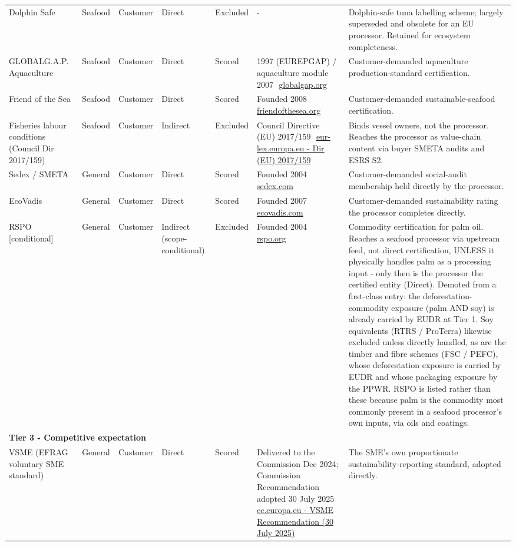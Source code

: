 \begin{landscape}
\begin{longtable}{p{2.9cm}p{1.2cm}p{1.3cm}p{1.2cm}p{1.4cm}p{3.2cm}p{5.9cm}}
Dolphin Safe & Seafood & Customer & Direct & Excluded & - & Dolphin-safe tuna labelling scheme; largely superseded and obsolete for an EU processor. Retained for ecosystem completeness. \\
GLOBALG.A.P. Aquaculture & Seafood & Customer & Direct & Scored & 1997 (EUREPGAP) / aquaculture module 2007~\,\href{https://www.globalgap.org}{globalgap.org} & Customer-demanded aquaculture production-standard certification. \\
Friend of the Sea & Seafood & Customer & Direct & Scored & Founded 2008~\,\href{https://friendofthesea.org}{friendofthesea.org} & Customer-demanded sustainable-seafood certification. \\
Fisheries labour conditions (Council Dir 2017/159) & Seafood & Customer & Indirect & Excluded & Council Directive (EU) 2017/159~\,\href{https://eur-lex.europa.eu/eli/dir/2017/159/oj}{eur-lex.europa.eu - Dir (EU) 2017/159} & Binds vessel owners, not the processor. Reaches the processor as value-chain content via buyer SMETA audits and ESRS S2. \\
Sedex / SMETA & General & Customer & Direct & Scored & Founded 2004~\,\href{https://www.sedex.com}{sedex.com} & Customer-demanded social-audit membership held directly by the processor. \\
EcoVadis & General & Customer & Direct & Scored & Founded 2007~\,\href{https://ecovadis.com}{ecovadis.com} & Customer-demanded sustainability rating the processor completes directly. \\
RSPO  [conditional] & General & Customer & Indirect (scope-conditional) & Excluded & Founded 2004~\,\href{https://rspo.org}{rspo.org} & Commodity certification for palm oil. Reaches a seafood processor via upstream feed, not direct certification, UNLESS it physically handles palm as a processing input - only then is the processor the certified entity (Direct). Demoted from a first-class entry: the deforestation-commodity exposure (palm AND soy) is already carried by EUDR at Tier 1. Soy equivalents (RTRS / ProTerra) likewise excluded unless directly handled, as are the timber and fibre schemes (FSC / PEFC), whose deforestation exposure is carried by EUDR and whose packaging exposure by the PPWR. RSPO is listed rather than these because palm is the commodity most commonly present in a seafood processor's own inputs, via oils and coatings. \\
\multicolumn{7}{l}{\rule{0pt}{1.1em}\textbf{Tier 3 - Competitive expectation}}\\[1pt]
VSME (EFRAG voluntary SME standard) & General & Customer & Direct & Scored & Delivered to the Commission Dec 2024; Commission Recommendation adopted 30 July 2025~\,\href{https://ec.europa.eu/finance/docs/law/250730-recommendation-vsme_en.pdf}{ec.europa.eu - VSME Recommendation (30 July 2025)} & The SME's own proportionate sustainability-reporting standard, adopted directly. \\

\end{longtable}
\end{landscape}
